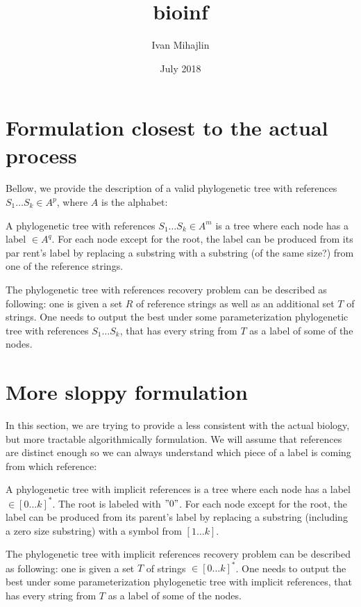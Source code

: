 \documentclass{article}
\title{bioinf}
\author{Ivan Mihajlin}
\date{July 2018}
\begin{document}
\maketitle

\section{Formulation closest to the actual process}

Bellow, we provide the description of a valid phylogenetic tree with references $S_1 \dots S_k \in A^p$, where $A$ is the alphabet:

A phylogenetic tree with references $S_1 \dots S_k \in A^m$ is a tree where each node has a label $\in A^q$. For each node except for the root, the label can be produced from its par rent's label by replacing a substring with a substring (of the same size?) from one of the reference strings.

The phylogenetic tree with references recovery problem can be described as following: one is given a set $R$ of reference strings as well as an additional set $T$ of strings. One needs to output the best under some parameterization phylogenetic tree with references $S_1 \dots S_k$, that has every string from $T$ as a label of some of the nodes. 


\section{More sloppy formulation}

In this section, we are trying to provide a less consistent with the actual biology, but more tractable algorithmically formulation. We will assume that references are distinct enough so we can always understand which piece of a label is coming from which reference:

A phylogenetic tree with implicit references is a tree where each node has a label $\in [0 \dots k]^*$. The root is labeled with $"0"$. For each node except for the root, the label can be produced from its parent's label by replacing a substring (including a zero size substring) with a symbol from $[1 \dots k]$.

The phylogenetic tree with implicit references recovery problem can be described as following: one is given a set $T$ of strings $\in [0 \dots k]^*$. One needs to output the best under some parameterization phylogenetic tree with implicit references, that has every string from $T$ as a label of some of the nodes. 
\end{document}
